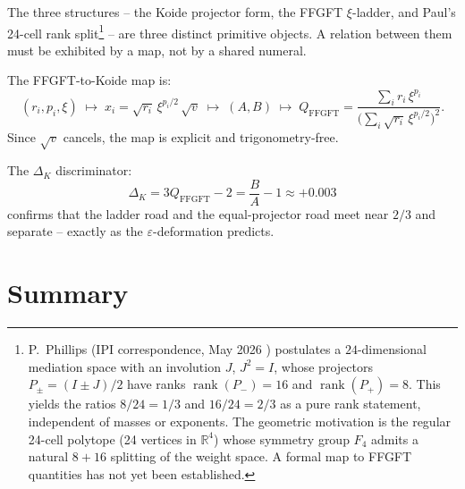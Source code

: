 The three structures -- the Koide projector form, the FFGFT \(\xi\)-ladder,
and Paul's 24-cell rank split\footnote{%
P.~Phillips (IPI correspondence, May 2026 \cite{Phillips2026}) postulates a
\(24\)-dimensional mediation space with an involution \(J\),
\(J^2 = I\), whose projectors \(P_\pm = (I \pm J)/2\) have ranks
\(\operatorname{rank}(P_-) = 16\) and \(\operatorname{rank}(P_+) = 8\).
This yields the ratios \(8/24 = 1/3\) and \(16/24 = 2/3\)
as a pure rank statement, independent of masses or exponents.
The geometric motivation is the regular 24-cell polytope (24 vertices
in \(\mathbb{R}^4\)) whose symmetry group \(F_4\) admits a natural
\(8+16\) splitting of the weight space.
A formal map to FFGFT quantities has not yet been established.} --
are three distinct primitive objects.
A relation between them must be exhibited by a map, not by a shared numeral.

The FFGFT-to-Koide map is:
\begin{equation}
  (r_i, p_i, \xi)
  \;\longmapsto\;
  x_i = \sqrt{r_i}\,\xi^{p_i/2}\,\sqrt{v}
  \;\longmapsto\;
  (A, B)
  \;\longmapsto\;
  Q_{\text{FFGFT}} = \frac{\sum_i r_i\,\xi^{p_i}}
  {\bigl(\sum_i \sqrt{r_i}\,\xi^{p_i/2}\bigr)^2}.
\end{equation}
Since \(\sqrt{v}\) cancels, the map is explicit and trigonometry-free.

The \(\Delta_K\) discriminator:
\begin{equation}
  \Delta_K = 3Q_{\text{FFGFT}} - 2 = \frac{B}{A} - 1 \approx +0.003
\end{equation}
confirms that the ladder road and the equal-projector road meet near \(2/3\)
and separate -- exactly as the \(\varepsilon\)-deformation predicts.

\section{Summary}

